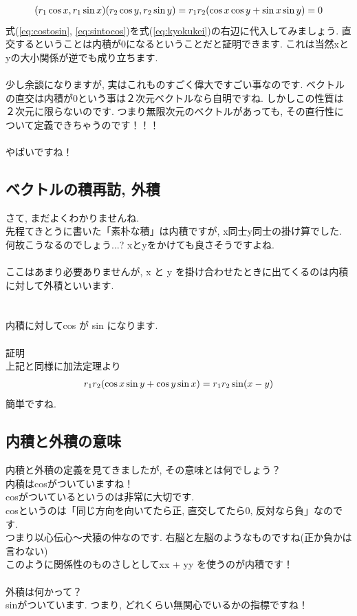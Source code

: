 \documentclass[11pt,a4paper]{jreport}
\begin{document}
\begin{eqnarray}
(\mathstrut r_1\cos x, \mathstrut r_1\sin x)(\mathstrut r_2\cos y, \mathstrut r_2\sin y) = \mathstrut r_1\mathstrut r_2(\cos x\cos y + \sin x\sin y) = 0
\label{eq:kyokukei}
\end{eqnarray}
式(\ref{eq:costosin}, \ref{eq:sintocos})を式(\ref{eq:kyokukei})の右辺に代入してみましょう. 直交するということは内積が0になるということだと証明できます. これは当然xとyの大小関係が逆でも成り立ちます. \\
\\
少し余談になりますが, 実はこれものすごく偉大ですごい事なのです. ベクトルの直交は内積が0という事は２次元ベクトルなら自明ですね. しかしこの性質は２次元に限らないのです. つまり無限次元のベクトルがあっても, その直行性について定義できちゃうのです！！！\\
\\
やばいですね！\\


\subsection{ベクトルの積再訪, 外積}
さて, まだよくわかりませんね. \\
先程てきとうに書いた「素朴な積」は内積ですが, x同士y同士の掛け算でした.\\
何故こうなるのでしょう...? xとyをかけても良さそうですよね.\\
\\
ここはあまり必要ありませんが, x と y を掛け合わせたときに出てくるのは内積に対して外積といいます.\\
\\
\\
内積に対してcos が sin になります.
\\
\\
証明\\
上記と同様に加法定理より\\
\begin{eqnarray}
\mathstrut r_1\mathstrut r_2(\cos x\sin y + \cos y\sin x) = \mathstrut r_1\mathstrut r_2\sin (x-y)
\end{eqnarray}
簡単ですね.


\subsection{内積と外積の意味}
内積と外積の定義を見てきましたが, その意味とは何でしょう？\\
内積はcosがついていますね！\\
cosがついているというのは非常に大切です.\\
cosというのは「同じ方向を向いてたら正, 直交してたら0, 反対なら負」なのです.\\
つまり以心伝心～犬猿の仲なのです. 右脳と左脳のようなものですね(正か負かは言わない)\\
このように関係性のものさしとしてxx + yy を使うのが内積です！\\
\\
外積は何かって？\\
sinがついています. つまり, どれくらい無関心でいるかの指標ですね！
\end{document}
